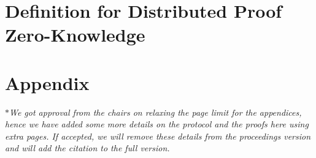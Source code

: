 \documentclass[USenglish,oneside,twocolumn]{article}
\begin{document}
\section{Definition for Distributed Proof Zero-Knowledge}
\label{sec:security model}

%
%
%





%
\appendix
\section*{Appendix}
\textit{$\ast$We got approval from the chairs on relaxing the page limit for the appendices, hence we have added some more details on the protocol and the proofs here using extra pages. If accepted, we will remove these details from the proceedings version and will add the citation to the full version.}
%
\end{document}

